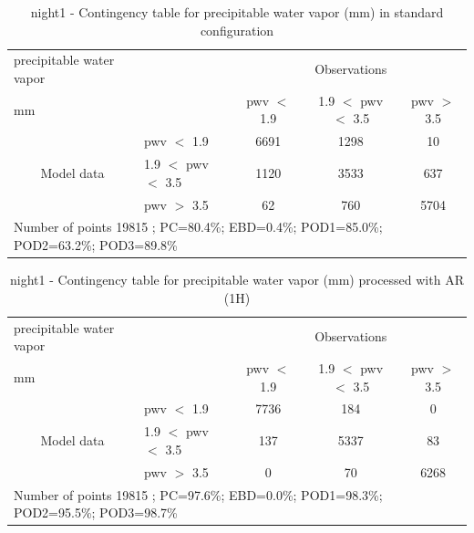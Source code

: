 \begin{table}[p!]
\begin{center}
\begin{tabular}{llccc}
\hline
{precipitable water vapor}                                       &                                                    & \multicolumn{3}{c}{Observations}                 \\
{mm}                                       &                             & pwv $<$ 1.9   & 1.9 $<$ pwv $<$ 3.5 & pwv $>$ 3.5 \\
\hline
\multicolumn{1}{c}{\multirow{3}{*}{Model data}}  & pwv $<$ 1.9             & 6691                & 1298                       & 10              \\
                                                 & 1.9  $<$ pwv $<$ 3.5 & 1120                & 3533                       & 637              \\
                                                 & pwv $>$ 3.5             & 62                & 760                       & 5704              \\
\hline
\multicolumn{5}{l}{ Number of points        19815 ; PC=80.4\%; EBD=0.4\%; POD1=85.0\%; POD2=63.2\%; POD3=89.8\%}                 \\
\end{tabular}
\end{center}
\caption{night1 - Contingency table for  precipitable water vapor (mm) in standard configuration  }
\label{tab:contingencypwvBEF:night1}
\end{table}
\begin{table}[p!]
\begin{center}
\begin{tabular}{llccc}
\hline
{precipitable water vapor}                                       &                                                    & \multicolumn{3}{c}{Observations}                 \\
{mm}                                       &                             & pwv $<$ 1.9   & 1.9 $<$ pwv $<$ 3.5 & pwv $>$ 3.5 \\
\hline
\multicolumn{1}{c}{\multirow{3}{*}{Model data}}  & pwv $<$ 1.9             & 7736                & 184                       & 0              \\
                                                 & 1.9  $<$ pwv $<$ 3.5 & 137                & 5337                       & 83              \\
                                                 & pwv $>$ 3.5             & 0                & 70                       & 6268              \\
\hline 
\multicolumn{5}{l}{ Number of points        19815 ; PC=97.6\%; EBD=0.0\%; POD1=98.3\%; POD2=95.5\%; POD3=98.7\%}
\end{tabular}
\end{center}
\caption{night1 - Contingency table for  precipitable water vapor (mm) processed with AR (1H)  }
\label{tab:contingencypwvAFT:night1}
\end{table}
